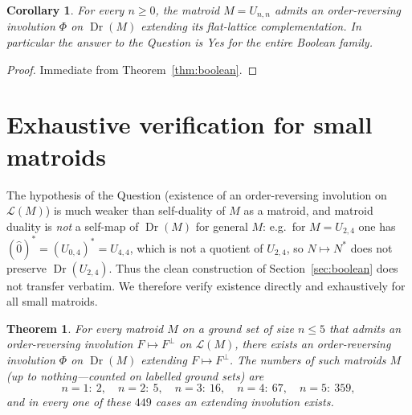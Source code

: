 \documentclass[11pt]{article}
\newcommand{\Dr}{\operatorname{Dr}}
\newcommand{\cL}{\mathcal{L}}
\newcommand{\dual}[1]{#1^{\ast}}
\newtheorem{theorem}{Theorem}
\newtheorem{corollary}{Corollary}
\theoremstyle{definition}
\theoremstyle{remark}
\begin{document}
\begin{corollary}\label{cor:boolean}
For every $n\ge 0$, the matroid $M=U_{n,n}$ admits an order-reversing involution
$\Phi$ on $\Dr(M)$ extending its flat-lattice complementation. In particular the
answer to the Question is \emph{Yes} for the entire Boolean family.
\end{corollary}

\begin{proof}
Immediate from Theorem~\ref{thm:boolean}.
\end{proof}

\section{Exhaustive verification for small matroids}\label{sec:exhaustive}

The hypothesis of the Question (existence of an order-reversing involution on
$\cL(M)$) is much weaker than self-duality of $M$ as a matroid, and matroid duality
is \emph{not} a self-map of $\Dr(M)$ for general $M$: e.g.\ for $M=U_{2,4}$ one has
$\dual{(\hat 0)}=\dual{(U_{0,4})}=U_{4,4}$, which is not a quotient of $U_{2,4}$, so
$N\mapsto\dual N$ does not preserve $\Dr(U_{2,4})$. Thus the clean construction of
Section~\ref{sec:boolean} does not transfer verbatim. We therefore verify existence
directly and exhaustively for all small matroids.

\begin{theorem}\label{thm:exhaustive}
For every matroid $M$ on a ground set of size $n\le 5$ that admits an order-reversing
involution $F\mapsto F^{\perp}$ on $\cL(M)$, there exists an order-reversing
involution $\Phi$ on $\Dr(M)$ extending $F\mapsto F^{\perp}$. The numbers of such
matroids $M$ (up to nothing---counted on labelled ground sets) are
\[
n=1:\ 2,\quad n=2:\ 5,\quad n=3:\ 16,\quad n=4:\ 67,\quad n=5:\ 359,
\]
and in every one of these $449$ cases an extending involution exists.
\end{theorem}
\end{document}
